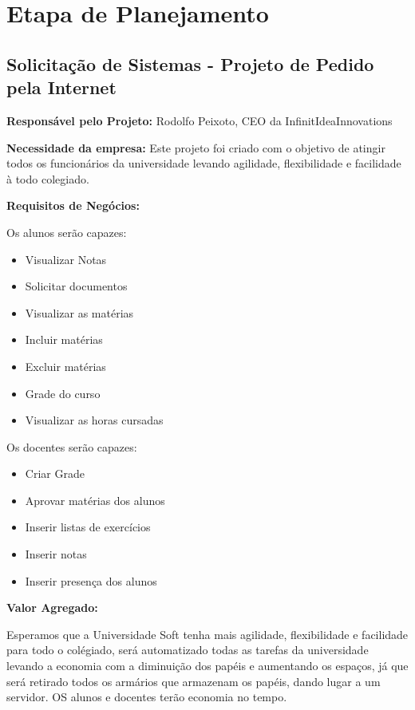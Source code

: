 

\chapter{Etapa de Planejamento}


\section{Solicitação de Sistemas - Projeto de Pedido pela Internet}


    \textbf{Responsável pelo Projeto:} \hfill Rodolfo Peixoto, CEO da InfinitIdeaInnovations

    \textbf{Necessidade da empresa:} \hfill Este projeto foi criado com o objetivo de atingir todos os funcionários da universidade levando agilidade,
    flexibilidade e facilidade à todo colegiado.

     \textbf{Requisitos de Negócios:}

     Os alunos serão capazes:

     \begin{itemize}
      \item Visualizar Notas
      \item Solicitar documentos
      \item Visualizar as matérias
      \item Incluir matérias
      \item Excluir matérias
      \item Grade do curso
      \item Visualizar as horas cursadas
     \end{itemize}

     Os docentes serão capazes:
     \begin{itemize}
      \item Criar Grade
      \item Aprovar matérias dos alunos
      \item Inserir listas de exercícios
      \item Inserir notas
      \item Inserir presença dos alunos
     \end{itemize}


    \textbf{Valor Agregado:}

    Esperamos que a Universidade Soft tenha mais agilidade, flexibilidade e facilidade para todo o colégiado, será automatizado todas as tarefas
    da universidade levando a economia com a diminuição dos papéis e aumentando os espaços, já que será retirado todos os armários que armazenam
    os papéis, dando lugar a um servidor. OS alunos e docentes terão economia no tempo.

